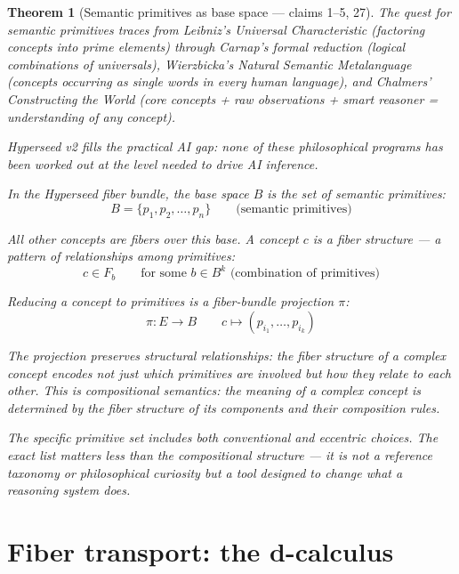 \documentclass[11pt,a4paper]{article}
\newtheorem{theorem}[definition]{Theorem}
\begin{document}
\begin{theorem}[Semantic primitives as base space --- claims 1--5, 27]
\label{thm:base}
The quest for semantic primitives traces from Leibniz's Universal
Characteristic (factoring concepts into prime elements) through Carnap's
formal reduction (logical combinations of universals), Wierzbicka's Natural
Semantic Metalanguage (concepts occurring as single words in every human
language), and Chalmers' Constructing the World (core concepts + raw
observations + smart reasoner = understanding of any concept).

Hyperseed v2 fills the practical AI gap: none of these philosophical
programs has been worked out at the level needed to drive AI inference.

In the Hyperseed fiber bundle, the base space $B$ is the set of semantic
primitives:
\[
  B = \{p_1, p_2, \ldots, p_n\} \qquad \text{(semantic primitives)}
\]

All other concepts are fibers over this base. A concept $c$ is a
fiber structure --- a pattern of relationships among primitives:
\[
  c \in F_b \qquad \text{for some } b \in B^k
  \text{ (combination of primitives)}
\]

Reducing a concept to primitives is a fiber-bundle projection $\pi$:
\[
  \pi: E \to B \qquad c \mapsto (p_{i_1}, \ldots, p_{i_k})
\]

The projection preserves structural relationships: the fiber structure
of a complex concept encodes not just which primitives are involved but
how they relate to each other. This is compositional semantics: the
meaning of a complex concept is determined by the fiber structure of its
components and their composition rules.

The specific primitive set includes both conventional and eccentric
choices. The exact list matters less than the compositional structure ---
it is not a reference taxonomy or philosophical curiosity but a tool
designed to change what a reasoning system does.
\end{theorem}

\section{Fiber transport: the d-calculus}
\label{sec:dcalculus}
\end{document}
